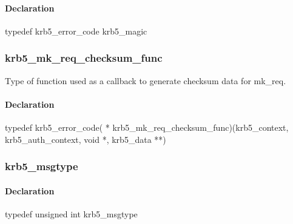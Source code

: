 \documentclass[letterpaper,10pt,english]{sphinxmanual}
\begin{document}
\paragraph{Declaration}
\label{appdev/refs/types/krb5_magic:declaration}
typedef krb5\_error\_code krb5\_magic


\subsubsection{krb5\_mk\_req\_checksum\_func}
\label{appdev/refs/types/krb5_mk_req_checksum_func:krb5-mk-req-checksum-func-struct}\label{appdev/refs/types/krb5_mk_req_checksum_func::doc}\label{appdev/refs/types/krb5_mk_req_checksum_func:krb5-mk-req-checksum-func}

\begin{fulllineitems}
\label{appdev/refs/types/krb5_mk_req_checksum_func:krb5_mk_req_checksum_func}
\end{fulllineitems}


Type of function used as a callback to generate checksum data for mk\_req.


\paragraph{Declaration}
\label{appdev/refs/types/krb5_mk_req_checksum_func:declaration}
typedef krb5\_error\_code( * krb5\_mk\_req\_checksum\_func)(krb5\_context, krb5\_auth\_context, void *, krb5\_data **)


\subsubsection{krb5\_msgtype}
\label{appdev/refs/types/krb5_msgtype:krb5-msgtype}\label{appdev/refs/types/krb5_msgtype::doc}\label{appdev/refs/types/krb5_msgtype:krb5-msgtype-struct}

\begin{fulllineitems}
\label{appdev/refs/types/krb5_msgtype:krb5_msgtype}
\end{fulllineitems}



\paragraph{Declaration}
\label{appdev/refs/types/krb5_msgtype:declaration}
typedef unsigned int krb5\_msgtype
\end{document}
